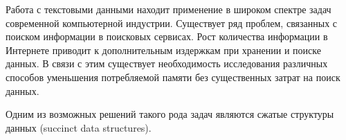 
Работа с текстовыми данными находит применение в широком спектре задач современной компьютерной индустрии.
Существует ряд проблем, связанных с поиском информации в поисковых сервисах.
Рост количества информации в Интернете приводит к дополнительным издержкам при хранении и поиске данных.
В связи с этим существует необходимость исследования различных способов уменьшения потребляемой памяти без
существенных затрат на поиск данных.


Одним из возможных решений такого рода задач являются сжатые структуры данных (succinct data structures).
